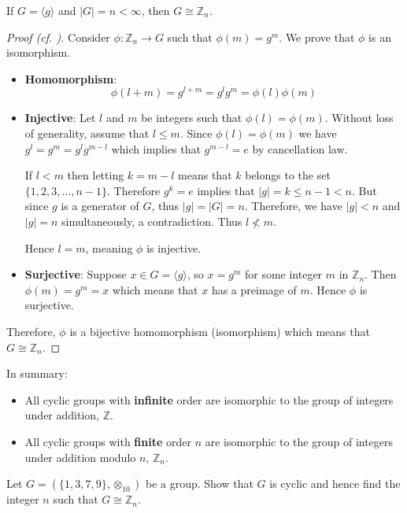\begin{theorem}\label{thrm-finite-cyclic-group-isomorphic-to-Zn}
    If $G = \langle g\rangle$ and $|G| = n < \infty$, then $G \cong \mathbb{Z}_n$.
\end{theorem}
\begin{proof}[Proof (cf. {\cite[\S 63]{clark_1984}})]
    Consider $\phi: \mathbb{Z}_n \to G$ such that $\phi(m) = g^m$. We prove that $\phi$ is an isomorphism.
    \begin{itemize}
        \item \textbf{Homomorphism}:
        \[
            \phi(l+m) = g^{l+m} = g^lg^m = \phi(l)\phi(m)
        \]
        \item \textbf{Injective}: Let $l$ and $m$ be integers such that $\phi(l) = \phi(m)$. Without loss of generality, assume that $l \leq m$. Since $\phi(l) = \phi(m)$ we have $g^l = g^m = g^lg^{m-l}$ which implies that $g^{m-l} = e$ by cancellation law.

        If $l < m$ then letting $k = m - l$ means that $k$ belongs to the set $\{1, 2, 3, \dots, n-1\}$. Therefore $g^k = e$ implies that $|g| = k \leq n - 1 < n$. But since $g$ is a generator of $G$, thus $|g| = |G| = n$. Therefore, we have $|g| < n$ and $|g| = n$ simultaneously, a contradiction. Thus $l \not< m$.

        Hence $l = m$, meaning $\phi$ is injective.
        \item \textbf{Surjective}: Suppose $x \in G = \langle g\rangle$, so $x = g^m$ for some integer $m$ in $\mathbb{Z}_n$. Then $\phi(m) = g^m = x$ which means that $x$ has a preimage of $m$. Hence $\phi$ is surjective.
    \end{itemize}

    Therefore, $\phi$ is a bijective homomorphism (isomorphism) which means that $G \cong \mathbb{Z}_n$.
\end{proof}

In summary:
\begin{itemize}
    \item All cyclic groups with \textbf{infinite} order are isomorphic to the group of integers under addition, $\mathbb{Z}$.
    \item All cyclic groups with \textbf{finite} order $n$ are isomorphic to the group of integers under addition modulo $n$, $\mathbb{Z}_n$.
\end{itemize}

\begin{exercise}
    Let $G = (\{1, 3, 7, 9\}, \otimes_{10})$ be a group. Show that $G$ is cyclic and hence find the integer $n$ such that $G \cong \mathbb{Z}_n$.
\end{exercise}

